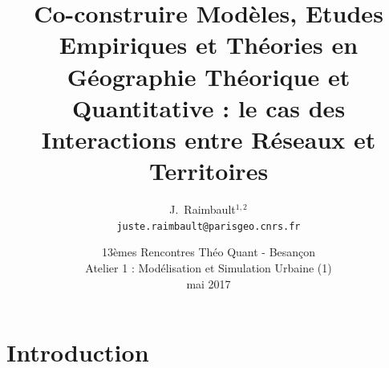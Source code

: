 \documentclass[english,11pt]{beamer}
\begin{document}
\title{Co-construire Modèles, Etudes Empiriques et Théories en Géographie Théorique et Quantitative : le cas des Interactions entre Réseaux et Territoires}

\author{J.~Raimbault$^{1,2}$\\
\texttt{juste.raimbault@parisgeo.cnrs.fr}
}




\date{13èmes Rencontres Théo Quant - Besançon\\\smallskip
Atelier 1 : Modélisation et Simulation Urbaine (1)\\ mai 2017
}

\frame{\maketitle}










\section{Introduction}


\end{document}
